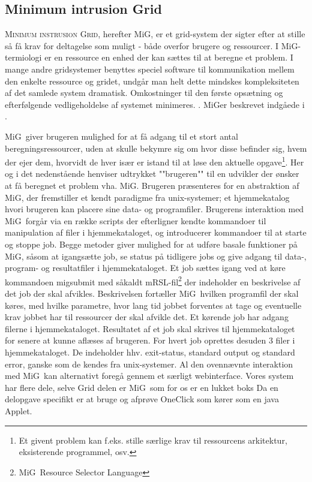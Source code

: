 \documentclass[draft,a4paper,10pt]{article}
\newcommand{\mig}{MiG}
\begin{document}
\subsection{Minimum intrusion Grid}\label{mig}

\textsc{Minimum instrusion Grid}, herefter \mig, er et grid-system der sigter efter at stille så få krav for deltagelse som muligt - både overfor brugere og ressourcer. I \mig-termiologi er en ressource en enhed der kan sættes til at beregne et problem. I mange andre gridsystemer benyttes speciel software til kommunikation mellem den enkelte ressource og gridet, undgår man helt dette mindskes kompleksiteten af det samlede system dramatisk. Omkostninger til den første opsætning og efterfølgende vedligeholdelse af systemet minimeres. . \mig er beskrevet indgåede i \cite{simplemig,mig}.

\mig\ giver brugeren mulighed for at få adgang til et stort antal beregningsressourcer, uden at skulle bekymre sig om hvor disse befinder sig, hvem der ejer dem, hvorvidt de hver især er istand til at løse den aktuelle opgave\footnote{Et givent problem kan f.eks. stille særlige krav til ressourcens arkitektur, eksisterende programmel, osv. }. Her og i det nedenstående henviser udtrykket ""brugeren"" til en udvikler der ønsker at få beregnet et problem vha. \mig {}. Brugeren præsenteres for en abstraktion af \mig, der fremstiller et kendt paradigme fra unix-systemer; et hjemmekatalog hvori brugeren kan placere sine data- og programfiler. Brugerens interaktion med \mig\ forgår via en række scripts der efterligner kendte kommandoer til manipulation af filer i hjemmekataloget, og introducerer kommandoer til at starte og stoppe job. Begge metoder giver mulighed for at udføre basale funktioner på \mig, såsom at igangsætte job, se status på tidligere jobs og give adgang til data-, program- og resultatfiler i hjemmekataloget. Et job sættes igang ved at køre kommandoen migsubmit med såkaldt mRSL-fil\footnote{\mig\ Resource Selector Language} der indeholder en beskrivelse af det job der skal afvikles. Beskrivelsen fortæller \mig\ hvilken programfil der skal køres, med hvilke parametre, hvor lang tid jobbet forventes at tage og eventuelle krav jobbet har til ressourcer der skal afvikle det. Et kørende job har adgang filerne i  hjemmekataloget. Resultatet af et job skal skrives til hjemmekataloget for senere at kunne aflæses af brugeren. For hvert job oprettes desuden 3 filer i hjemmekataloget. De indeholder hhv. exit-status, standard output og standard error, ganske som de kendes fra unix-systemer. 
Al den ovennævnte interaktion med \mig\ kan alternativt foregå gennem et særligt webinterface. 
Vores system har flere dele, selve Grid delen er \mig\ som for os er en lukket boks
Da en delopgave specifikt er at bruge og afprøve OneClick som kører som en java Applet.
\end{document}
